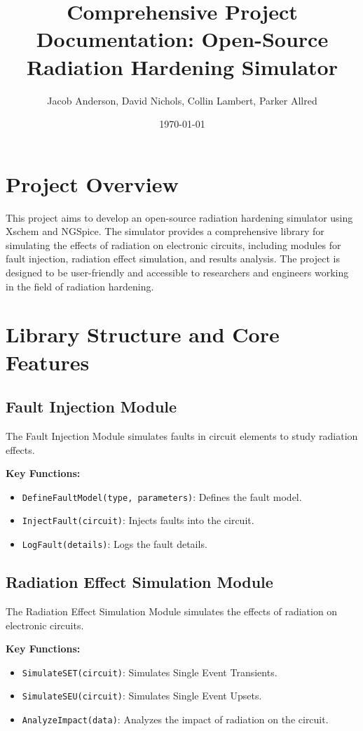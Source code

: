 \documentclass[12pt]{article}
\title{Comprehensive Project Documentation: Open-Source Radiation Hardening Simulator}
\author{Jacob Anderson, David Nichols, Collin Lambert, Parker Allred}
\date{\today}
\begin{document}
\maketitle
\tableofcontents
\newpage

\section{Project Overview}
This project aims to develop an open-source radiation hardening simulator using Xschem and NGSpice. The simulator provides a comprehensive library for simulating the effects of radiation on electronic circuits, including modules for fault injection, radiation effect simulation, and results analysis. The project is designed to be user-friendly and accessible to researchers and engineers working in the field of radiation hardening.

\section{Library Structure and Core Features}
\subsection{Fault Injection Module}
The Fault Injection Module simulates faults in circuit elements to study radiation effects.

\textbf{Key Functions:}
\begin{itemize}
    \item \texttt{DefineFaultModel(type, parameters)}: Defines the fault model.
    \item \texttt{InjectFault(circuit)}: Injects faults into the circuit.
    \item \texttt{LogFault(details)}: Logs the fault details.
\end{itemize}

\subsection{Radiation Effect Simulation Module}
The Radiation Effect Simulation Module simulates the effects of radiation on electronic circuits.

\textbf{Key Functions:}
\begin{itemize}
    \item \texttt{SimulateSET(circuit)}: Simulates Single Event Transients.
    \item \texttt{SimulateSEU(circuit)}: Simulates Single Event Upsets.
    \item \texttt{AnalyzeImpact(data)}: Analyzes the impact of radiation on the circuit.
\end{itemize}
\end{document}
